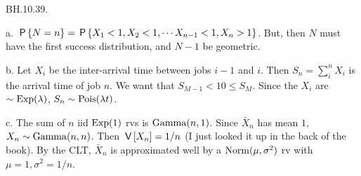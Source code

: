 \setcounter{theorem}{38}
\begin{exercise}
BH.10.39.
\begin{solution}
a.
 $\P{N=n} = \P{X_1 < 1, X_2<1, \cdots X_{n-1}<1, X_n>1}$. But, then $N$ must have the  first success distribution, and $N-1$ be geometric.


b.
Let $X_i$ be the inter-arrival time between jobs $i-1$ and $i$. Then $S_n=\sum_i^n X_i$ is the arrival time of job $n$. We want that $S_{M-1} < 10 \leq S_M$. Since the $X_i$ are $\sim \Exp{\lambda}$, $S_n \sim \Pois{\lambda t}$.

c.  The sum of $n$ iid $\Exp{1}$ rvs is $\Gamm{n,1}$. Since $\bar X_{n}$ has mean $1$, $X_{n} \sim \Gamm{n,n}$. Then $\V{X_n} = 1/n$ (I just looked it up in the back of the book).  By the CLT, $\bar X_n$ is approximated well by a $\Norm{\mu, \sigma^{2}}$ rv with $\mu=1, \sigma^2=1/n$.

\end{solution}
\end{exercise}




